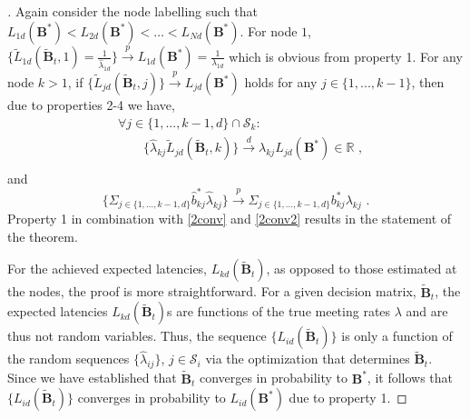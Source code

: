 \documentclass[journal,onecolumn,11pt]{IEEEtran}
\theoremstyle{plain}
\theoremstyle{definition}
\begin{document}
\begin{proof}[\unskip\nopunct]
Again consider the node labelling such that $L_{1d}(\mathbf{B}^*) <
L_{2d}(\mathbf{B}^*) < \dots < L_{Nd}(\mathbf{B}^*)$. For node $1$,
$\{\widetilde{L}_{1d}(\widetilde{\mathbf{B}}_t,1)=\frac{1}{\widehat{\lambda}_{1d}}\}\xrightarrow{p}
L_{1d}(\mathbf{B}^*)=\frac{1}{\lambda_{1d}}$ which is obvious from
property 1. For any node $k>1$, if
$\{\widetilde{L}_{jd}(\widetilde{\mathbf{B}}_t,j)\} \xrightarrow{p}
L_{jd}(\mathbf{B}^*)$ holds for any $j \in \{1,...,k-1\} $, then due
to properties 2-4 we have,
\begin{equation}\label{2conv}
\begin{aligned}
&\forall j \in \{1,...,k-1,d\}\cap \mathcal{S}_k: \\
&\quad \quad \{\widehat{\lambda}_{kj} \widetilde{L}_{jd}(\widetilde{\mathbf{B}}_t,k)\}\xrightarrow{d} \lambda_{kj} L_{jd}(\mathbf{B}^*) \in \mathbb{R}\,\,,\\
\end{aligned}
\end{equation}
and 
\begin{equation}\label{2conv2}
\{\Sigma_{j \in \{1,...,k-1,d\}} \hat{b}^*_{kj} \widehat{\lambda}_{kj}\} \xrightarrow{p} \Sigma_{j \in \{1,...,k-1,d\}} b^*_{kj} \lambda_{kj}\,\,.
\end{equation}
Property 1 in combination with \eqref{2conv} and \eqref{2conv2} results in the statement of the theorem.

For the achieved expected latencies, $L_{kd}(\widetilde{\mathbf{B}}_t)$, as opposed to those estimated at
the nodes, the proof is more straightforward. For a given decision
matrix, $\widetilde{\mathbf{B}}_t$, the expected latencies
$L_{kd}(\widetilde{\mathbf{B}}_t)$s are functions of the true
meeting rates $\lambda$ and are thus not random variables. Thus, the sequence
$\{{L}_{id}(\widetilde{\mathbf{B}}_t)\}$ is only a function of the random sequences $\{
\widehat{\lambda}_{ij} \}$, $j \in \mathcal{S}_i$ via the optimization
that determines $\widetilde{\mathbf{B}}_t$. Since we have
 established that $\widetilde{\mathbf{B}}_t$ converges in probability to
$\mathbf{B}^*$, it follows that $\{{L}_{id}(\widetilde{\mathbf{B}}_t)\}$ converges in
probability to $L_{id}(\mathbf{B}^*)$ due to property 1.

\end{proof}

\ifCLASSOPTIONcaptionsoff
  \newpage
\fi



\end{document}
